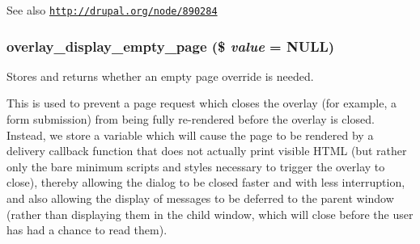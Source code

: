 \begin{DoxySeeAlso}{See also}
\href{http://drupal.org/node/890284}{\tt http://drupal.org/node/890284} 
\end{DoxySeeAlso}
\hypertarget{overlay_8module_ad2c28dedc5eeec4a4374139bc1ba3a61}{
\subsubsection[{overlay\_\-display\_\-empty\_\-page}]{\setlength{\rightskip}{0pt plus 5cm}overlay\_\-display\_\-empty\_\-page (\$ {\em value} = {\ttfamily NULL})}}
\label{overlay_8module_ad2c28dedc5eeec4a4374139bc1ba3a61}
Stores and returns whether an empty page override is needed.

This is used to prevent a page request which closes the overlay (for example, a form submission) from being fully re-\/rendered before the overlay is closed. Instead, we store a variable which will cause the page to be rendered by a delivery callback function that does not actually print visible HTML (but rather only the bare minimum scripts and styles necessary to trigger the overlay to close), thereby allowing the dialog to be closed faster and with less interruption, and also allowing the display of messages to be deferred to the parent window (rather than displaying them in the child window, which will close before the user has had a chance to read them).


